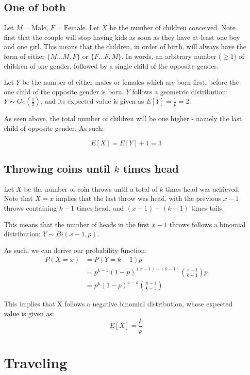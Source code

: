 \documentclass[a4paper]{scrreprt}
\begin{document}
\subsection{One of both}

Let $M = \text{Male}$, $F = \text{Female}$. Let $X$ be the number of children
conceived. Note first that the couple will stop having kids as soon as they
have at least one boy and one girl. This means that the children, in order of
birth, will always have the form of either $\{M \ldots M, F\}$ or $\{F \ldots
F, M\}$. In words, an arbitrary number ($\geq 1$) of children of one gender,
followed by a single child of the opposite gender.

Let $Y$ be the number of either males or females which are born first, before
the one child of the opposite gender is born. $Y$ follows a geometric
distribution: $Y \sim Ge\left(\frac{1}{2}\right)$, and its expected value is
given as $E[Y] = \frac{1}{p} = 2$.

As seen above, the total number of children will be one higher - namely the
last child of opposite gender. As such:

\[
	E[X] = E[Y] + 1 = 3
\]

\subsection{Throwing coins until $k$ times head}

Let $X$ be the number of coin throws until a total of $k$ times head was
achieved. Note that $X=x$ implies that the last throw was head, with the
previous $x-1$ throws containing $k-1$ times head, and $(x-1)-(k-1)$ times
tails.

This means that the number of heads in the first $x-1$ throws follows a
binomial distribution: $Y \sim Bi(x-1, p)$.

As such, we can derive our probability function:
\begin{align*}
	P(X=x) & = P(Y = k-1) p \\
	       & = p^{k-1} (1-p)^{(x-1) - (k-1)} \binom{x-1}{k-1} p \\
	       & = p^k (1-p)^{x-k} \binom{n-1}{k-1}
\end{align*}

This implies that X follows a negative binomial distribution, whose expected value is given as:
\[
	E[X] = \frac{k}{p}
\]

\section{Traveling}
\end{document}
